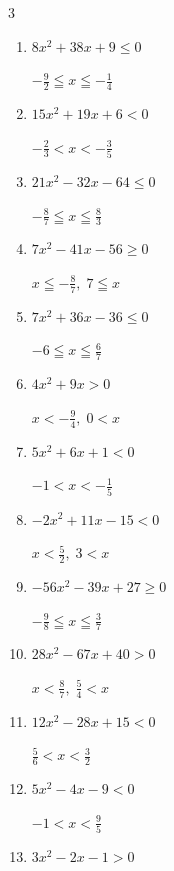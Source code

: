 \begin{multicols}{3}
\begin{enumerate}
  \item $8x^{2}+38x+9\leq 0$

        $\displaystyle -\frac{9}{2} \leqq x \leqq -\frac{1}{4}$

  \item $15x^{2}+19x+6<0$

        $\displaystyle -\frac{2}{3} < x < -\frac{3}{5}$

  \item $21x^{2}-32x-64\leq 0$

        $\displaystyle -\frac{8}{7} \leqq x \leqq \frac{8}{3}$

\columnbreak %

  \item $7x^{2}-41x-56\geq 0$

        $\displaystyle x \leqq -\frac{8}{7} , \; 7 \leqq x$

  \item $7x^{2}+36x-36\leq 0$

        $\displaystyle -6 \leqq x \leqq \frac{6}{7}$

  \item $4x^{2}+9x>0$

        $\displaystyle x < -\frac{9}{4} , \; 0 < x$

  \item $5x^{2}+6x+1<0$

        $\displaystyle -1 < x < -\frac{1}{5}$

  \item $-2x^{2}+11x-15<0$

        $\displaystyle x < \frac{5}{2} , \; 3 < x$

  \item $-56x^{2}-39x+27\geq 0$

        $\displaystyle -\frac{9}{8} \leqq x \leqq \frac{3}{7}$

  \item $28x^{2}-67x+40>0$

        $\displaystyle x < \frac{8}{7} , \; \frac{5}{4} < x$

  \item $12x^{2}-28x+15<0$

        $\displaystyle \frac{5}{6} < x < \frac{3}{2}$

  \item $5x^{2}-4x-9<0$

        $\displaystyle -1 < x < \frac{9}{5}$

  \item $3x^{2}-2x-1>0$


\end{enumerate}
\end{multicols}
